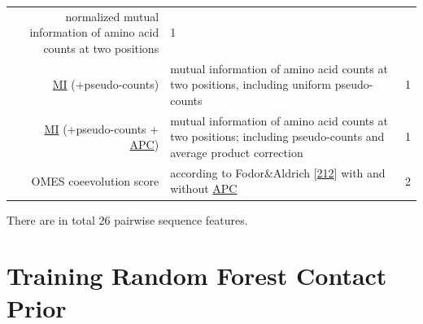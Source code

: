 \documentclass[11pt,a4paper,twoside]{book}
\theoremstyle{definition}
\theoremstyle{definition}
\theoremstyle{remark}
\begin{document}
\begin{longtable}[]{@{}rlc@{}}
\begin{minipage}[t]{0.50\columnwidth}
normalized mutual information of amino acid counts at two
positions\strut
\end{minipage} & \begin{minipage}[t]{0.18\columnwidth}\centering\strut
1\strut
\end{minipage}\tabularnewline
\begin{minipage}[t]{0.23\columnwidth}\raggedleft\strut
\protect\hyperlink{abbrev}{MI} (+pseudo-counts)\strut
\end{minipage} & \begin{minipage}[t]{0.50\columnwidth}\raggedright\strut
mutual information of amino acid counts at two positions, including
uniform pseudo-counts\strut
\end{minipage} & \begin{minipage}[t]{0.18\columnwidth}\centering\strut
1\strut
\end{minipage}\tabularnewline
\begin{minipage}[t]{0.23\columnwidth}\raggedleft\strut
\protect\hyperlink{abbrev}{MI} (+pseudo-counts +
\protect\hyperlink{abbrev}{APC})\strut
\end{minipage} & \begin{minipage}[t]{0.50\columnwidth}\raggedright\strut
mutual information of amino acid counts at two positions; including
pseudo-counts and average product correction\strut
\end{minipage} & \begin{minipage}[t]{0.18\columnwidth}\centering\strut
1\strut
\end{minipage}\tabularnewline
\begin{minipage}[t]{0.23\columnwidth}\raggedleft\strut
OMES coeevolution score\strut
\end{minipage} & \begin{minipage}[t]{0.50\columnwidth}\raggedright\strut
according to Fodor\&Aldrich
{[}\protect\hyperlink{ref-Fodor2004a}{212}{]} with and without
\protect\hyperlink{abbrev}{APC}\strut
\end{minipage} & \begin{minipage}[t]{0.18\columnwidth}\centering\strut
2\strut
\end{minipage}\tabularnewline
\bottomrule
\end{longtable}

There are in total 26 pairwise sequence features.

\section{Training Random Forest Contact Prior}\label{rf-training}
\end{document}
